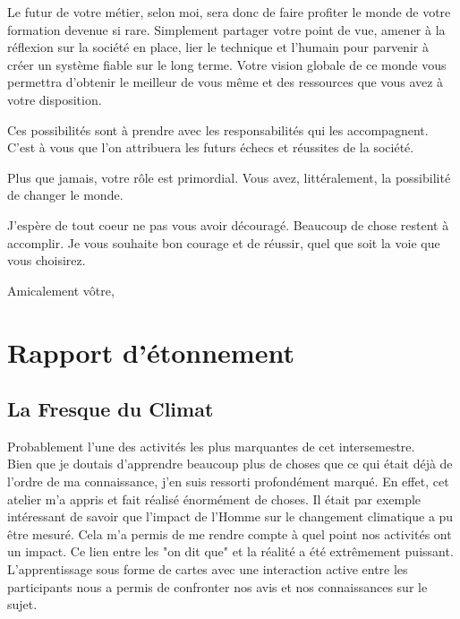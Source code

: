 Le futur de votre métier, selon moi, sera donc de faire profiter le monde de votre formation devenue si rare. Simplement partager votre point de vue,
amener à la réflexion sur la société en place, lier le technique et l'humain pour parvenir à créer un système fiable sur le long terme.
Votre vision globale de ce monde vous permettra d'obtenir le meilleur de vous même et des ressources que vous avez à votre disposition.

Ces possibilités sont à prendre avec les responsabilités qui les accompagnent. C'est à vous que l'on attribuera les futurs échecs et réussites de la société.

Plus que jamais, votre rôle est primordial. Vous avez, littéralement, la possibilité de changer le monde.

J'espère de tout coeur ne pas vous avoir découragé. Beaucoup de chose restent à accomplir.
Je vous souhaite bon courage et de réussir, quel que soit la voie que vous choisirez.

Amicalement vôtre,



\chapter{Rapport d'étonnement}

\newcommand{\pd}{Petits Débrouillards }

\section{La Fresque du Climat}

Probablement l'une des activités les plus marquantes de cet intersemestre.\\

Bien que je doutais d'apprendre beaucoup plus de choses que ce qui était déjà de l'ordre de ma connaissance, j'en suis ressorti profondément marqué. En effet, cet atelier m'a appris et fait réalisé énormément de choses.
Il était par exemple intéressant de savoir que l'impact de l'Homme sur le changement climatique a pu être mesuré. Cela m'a permis de me rendre compte à quel point nos activités ont un impact. Ce lien entre les "on dit que" et la réalité a été extrêmement puissant.\\

L'apprentissage sous forme de cartes avec une interaction active entre les participants nous a permis de confronter nos avis et nos connaissances sur le sujet. \\


